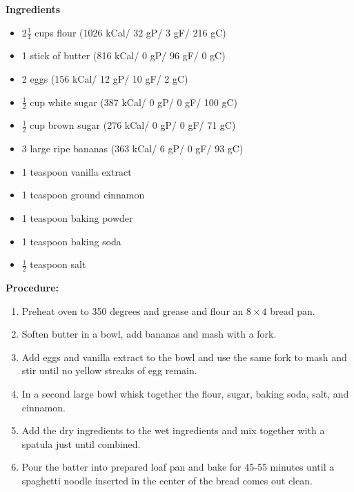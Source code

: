 \documentclass{report}
\begin{document}


\bigskip

\bigskip

\begin{multicols}{2}
\textbf{Ingredients}
\begin{itemize}
\item $2\frac{1}{4}$ cups flour \quad (1026 kCal/ 32 gP/ 3 gF/ 216 gC)
\item 1 stick of butter (816 kCal/ 0 gP/ 96 gF/ 0 gC)
\item 2 eggs  \quad (156 kCal/ 12 gP/ 10 gF/ 2 gC)
\item $\frac{1}{2}$ cup white sugar (387 kCal/ 0 gP/ 0 gF/ 100 gC)
\item $\frac{1}{2}$ cup brown sugar \quad (276 kCal/ 0 gP/ 0 gF/ 71 gC)
\item 3 large ripe bananas \quad (363 kCal/ 6 gP/ 0 gF/ 93 gC)
\item 1 teaspoon vanilla extract 
\item 1 teaspoon ground cinnamon
\item 1 teaspoon baking powder
\item 1 teaspoon baking soda 
\item $\frac{1}{2}$ teaspoon salt




\end{itemize}


\columnbreak
\textbf{Procedure:}
\medskip


\begin{enumerate}
\item Preheat oven to 350 degrees and grease and flour an $8\times4$ bread pan.

\item Soften butter in a bowl, add bananas and mash with a fork. 

\item Add eggs and vanilla extract to the bowl and use the same fork to mash and stir until no yellow streaks of egg remain.

\item In a second large bowl whisk together the flour, sugar, baking soda, salt, and cinnamon.

\item Add the dry ingredients to the wet ingredients and mix together with a spatula just until combined.

\item Pour the batter into prepared loaf pan and bake for 45-55 minutes until a spaghetti noodle inserted in the center of the bread comes out clean.



\end{enumerate}
\end{multicols}
\end{document}
